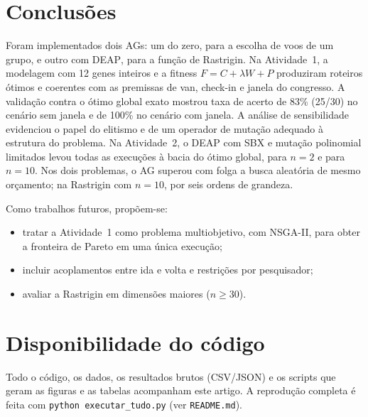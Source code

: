 \documentclass[conference]{IEEEtran}
\newcommand{\deap}{\textsc{DEAP}}
\newcommand{\code}[1]{\texttt{#1}}
\begin{document}
\section{Conclusões}
Foram implementados dois AGs: um do zero, para a escolha de voos de um grupo, e outro com \deap{}, para a função de Rastrigin. Na Atividade~1, a modelagem com 12 genes inteiros e a fitness $F=C+\lambda W+P$ produziram roteiros ótimos e coerentes com as premissas de van, check-in e janela do congresso. A validação contra o ótimo global exato mostrou taxa de acerto de 83\% (25/30) no cenário sem janela e de 100\% no cenário com janela. A análise de sensibilidade evidenciou o papel do elitismo e de um operador de mutação adequado à estrutura do problema. Na Atividade~2, o \deap{} com SBX e mutação polinomial limitados levou todas as execuções à bacia do ótimo global, para $n=2$ e para $n=10$. Nos dois problemas, o AG superou com folga a busca aleatória de mesmo orçamento; na Rastrigin com $n=10$, por seis ordens de grandeza.

Como trabalhos futuros, propõem-se:
\begin{itemize}
  \item tratar a Atividade~1 como problema multiobjetivo, com NSGA-II, para obter a fronteira de Pareto em uma única execução;
  \item incluir acoplamentos entre ida e volta e restrições por pesquisador;
  \item avaliar a Rastrigin em dimensões maiores ($n\ge30$).
\end{itemize}

\section*{Disponibilidade do código}
Todo o código, os dados, os resultados brutos (CSV/JSON) e os scripts que geram as figuras e as tabelas acompanham este artigo. A reprodução completa é feita com \code{python executar\_tudo.py} (ver \code{README.md}).



\end{document}
